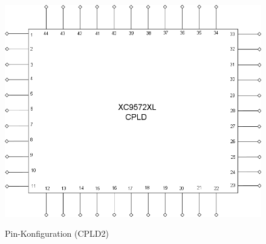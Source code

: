 \documentclass[a4paper,11pt]{article}
\begin{document}
		\begin{figure}[ht!]
		  \centering
		      \includegraphics[scale=0.48, angle=0]{PinDiagram.png}
			\label{fig:Pin1}
		  	\caption{Pin-Konfiguration (CPLD2)}
		\end{figure}
\end{document}
